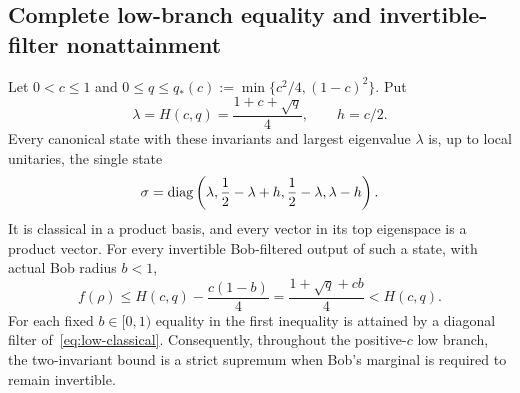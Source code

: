 \subsection{Complete low-branch equality and invertible-filter nonattainment}

\begin{theorem}\label{thm:low-branch}
Let $0<c\le1$ and $0\le q\le q_*(c):=\min\{c^2/4,(1-c)^2\}$. Put
\[
 \lambda=H(c,q)=\frac{1+c+\sqrt q}{4},\qquad h=c/2.
\]
Every canonical state with these invariants and largest eigenvalue $\lambda$ is, up to local unitaries, the single state
\begin{equation}\label{eq:low-classical}
 \sigma=\operatorname{diag}\left(\lambda,\frac12-\lambda+h,
                         \frac12-\lambda,\lambda-h\right).
\end{equation}
It is classical in a product basis, and every vector in its top eigenspace is a product vector. For every invertible Bob-filtered output of such a state, with actual Bob radius $b<1$,
\begin{equation}\label{eq:low-filtered}
 \boxed{f(\rho)\le H(c,q)-\frac{c(1-b)}4
                   =\frac{1+\sqrt q+cb}{4}<H(c,q).}
\end{equation}
For each fixed $b\in[0,1)$ equality in the first inequality is attained by a diagonal filter of~\eqref{eq:low-classical}.
Consequently, throughout the positive-$c$ low branch, the two-invariant bound is a strict supremum when Bob's marginal is required to remain invertible.
\end{theorem}
